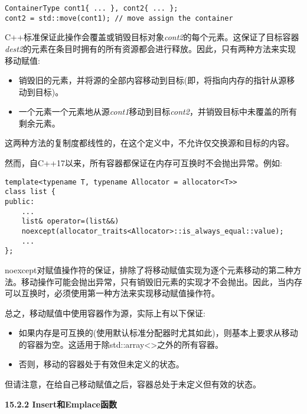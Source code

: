 \begin{lstlisting}[caption={}]
ContainerType cont1{ ... }, cont2{ ... };
cont2 = std::move(cont1); // move assign the container
\end{lstlisting}

C++标准保证此操作会覆盖或销毁目标对象\textit{cont2}的每个元素。这保证了目标容器\textit{dest2}的元素在条目时拥有的所有资源都会进行释放。因此，只有两种方法来实现移动赋值:\par

\begin{itemize}
	\item 销毁旧的元素，并将源的全部内容移动到目标(即，将指向内存的指针从源移动到目标)。
	\item 一个元素一个元素地从源\textit{cont1}移动到目标\textit{cont2}，并销毁目标中未覆盖的所有剩余元素。
\end{itemize}

这两种方法的复制度都线性的，在这个定义中，不允许仅交换源和目标的内容。\par

然而，自C++17以来，所有容器都保证在内存可互换时不会抛出异常。例如:\par

\begin{lstlisting}[caption={}]
template<typename T, typename Allocator = allocator<T>>
class list {
public:
	...
	list& operator=(list&&)
	noexcept(allocator_traits<Allocator>::is_always_equal::value);
	...
};
\end{lstlisting}

noexcept对赋值操作符的保证，排除了将移动赋值实现为逐个元素移动的第二种方法。移动操作可能会抛出异常，只有销毁旧元素的实现才不会抛出。因此，当内存可以互换时，必须使用第一种方法来实现移动赋值操作符。\par

总之，移动赋值中使用容器作为源，实际上有以下保证:\par

\begin{itemize}
	\item 如果内存是可互换的(使用默认标准分配器时尤其如此)，则基本上要求从移动的容器为空。这适用于除std::array<>之外的所有容器。
	\item 否则，移动的容器处于有效但未定义的状态。
\end{itemize}

但请注意，在给自己移动赋值之后，容器总处于未定义但有效的状态。\par

\hspace*{\fill} \par %
\textbf{15.2.2 Insert和Emplace函数}

